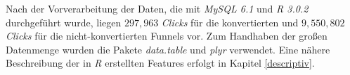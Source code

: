 Nach der Vorverarbeitung der Daten, die mit \textit{MySQL 6.1} und \textit{R 3.0.2} \cite{r} durchgeführt wurde, liegen $ 297,963 $ \textit{Clicks} für die konvertierten und $ 9,550,802 $ \textit{Clicks} für die nicht-konvertierten Funnels vor. Zum Handhaben der großen Datenmenge wurden die Pakete \textit{data.table} \cite{data.table} und \textit{plyr} \cite{plyr} verwendet. Eine nähere Beschreibung der in \textit{R} erstellten Features erfolgt in Kapitel \ref{descriptiv}.\\



